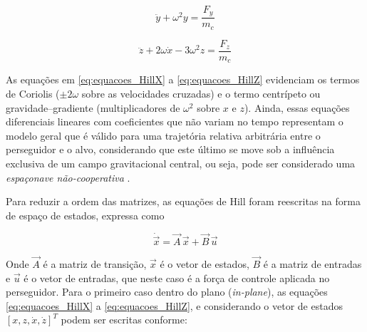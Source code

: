 \begin{equation}
    \label{eq:equacoes_HillY}
\ddot{y} + \omega^2 y = \frac{F_y}{m_c}
\end{equation}

\begin{equation}
    \label{eq:equacoes_HillZ}
\ddot{z} + 2\omega \dot{x} - 3 \omega^2 z = \frac{F_z}{m_c}
\end{equation}

As equações em \eqref{eq:equacoes_HillX} a \eqref{eq:equacoes_HillZ} evidenciam os termos de Coriolis ($\pm2\omega$ sobre as velocidades cruzadas) e o termo centrípeto ou gravidade--gradiente (multiplicadores de $\omega^2$ sobre $x$ e $z$).
Ainda, essas equações diferenciais lineares com coeficientes que não variam no tempo representam o modelo geral que é válido para uma trajetória relativa arbitrária \cite{debruijn2011,ortolano2017} entre o perseguidor e o alvo, considerando que este último se move sob a influência exclusiva de um campo gravitacional central, ou seja, pode ser considerado uma \emph{espaçonave não-cooperativa} \cite{mahendrakar2023}.

Para reduzir a ordem das matrizes, as equações de Hill foram reescritas na forma de espaço de estados, expressa como \cite{fehse2003,starek2016,sherrill2014}

\begin{equation}
    \dot{\vec{x}} = \vec{A}\,\vec{x} + \vec{B}\,\vec{u}
    \label{eq:state_space_general}
\end{equation}

Onde $\vec{A}$ é a matriz de transição, $\vec{x}$ é o vetor de estados, $\vec{B}$ é a matriz de entradas e $\vec{u}$ é o vetor de entradas, que neste caso é a força de controle aplicada no perseguidor.
Para o primeiro caso dentro do plano (\textit{in-plane}), as equações \eqref{eq:equacoes_HillX} a \eqref{eq:equacoes_HillZ}, e considerando o vetor de estados
$[x, z, \dot{x}, \dot{z}]^T$ podem ser escritas conforme:

